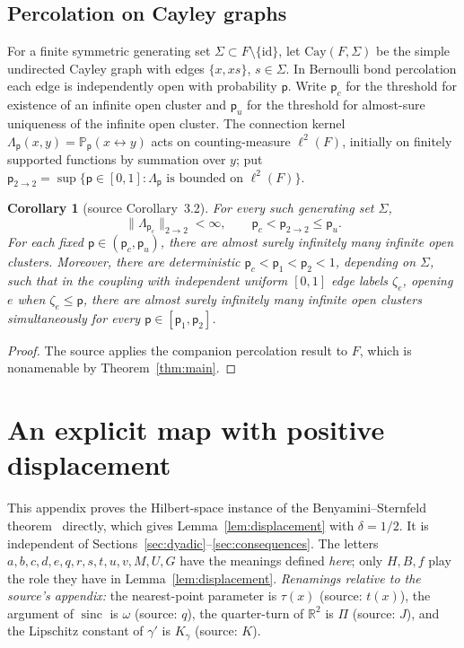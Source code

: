 \documentclass[11pt]{article}
\newcommand{\R}{\mathbb R}
\newcommand{\norm}[1]{\lVert #1\rVert}
\newcommand{\id}{\mathrm{id}}
\DeclareMathOperator{\sinc}{sinc}
\newtheorem{corollary}[theorem]{Corollary}
\theoremstyle{definition}
\numberwithin{equation}{section}
\begin{document}
\subsection{Percolation on Cayley graphs}

For a finite symmetric generating set
\(\Sigma\subset F\setminus\{\id\}\), let \(\mathrm{Cay}(F,\Sigma)\) be the
simple undirected Cayley graph with edges \(\{x,xs\}\), \(s\in\Sigma\).
In Bernoulli bond percolation each edge is independently open with
probability \(\mathsf p\). Write \(\mathsf p_c\) for the threshold for
existence of an infinite open cluster and \(\mathsf p_u\) for the
threshold for almost-sure uniqueness of the infinite open cluster. The
connection kernel
\(\Lambda_{\mathsf p}(x,y)=\mathbb P_{\mathsf p}(x\leftrightarrow y)\)
acts on counting-measure \(\ell^2(F)\), initially on finitely supported
functions by summation over \(y\); put
\(\mathsf p_{2\to2}=\sup\{\mathsf p\in[0,1]:
\Lambda_{\mathsf p}\text{ is bounded on }\ell^2(F)\}\).

\begin{corollary}[source Corollary~3.2]\label{cor:percolation}
For every such generating set \(\Sigma\),
\[
  \norm{\Lambda_{\mathsf p_c}}_{2\to2}<\infty,\qquad
  \mathsf p_c<\mathsf p_{2\to2}\le \mathsf p_u.
\]
For each fixed \(\mathsf p\in(\mathsf p_c,\mathsf p_u)\), there are almost
surely infinitely many infinite open clusters. Moreover, there are
deterministic \(\mathsf p_c<\mathsf p_1<\mathsf p_2<1\), depending on
\(\Sigma\), such that in the coupling with independent uniform \([0,1]\)
edge labels \(\zeta_e\), opening \(e\) when \(\zeta_e\le\mathsf p\), there
are almost surely infinitely many infinite open clusters simultaneously
for every \(\mathsf p\in[\mathsf p_1,\mathsf p_2]\).
\end{corollary}

\begin{proof}
The source applies the companion percolation result
\cite[Corollary~1.2]{OpenAIPercolation2026} to \(F\), which is
nonamenable by Theorem~\ref{thm:main}.
\end{proof}

\appendix
\section{An explicit map with positive displacement}\label{app:auxiliary}

This appendix proves the Hilbert-space instance of the
Benyamini--Sternfeld theorem~\cite{BenyaminiSternfeld1983} directly, which
gives Lemma~\ref{lem:displacement} with \(\delta=1/2\). It is independent
of Sections~\ref{sec:dyadic}--\ref{sec:consequences}. The letters
\(a,b,c,d,e,q,r,s,t,u,v,M,U,G\) have the meanings defined \emph{here};
only \(H,B,f\) play the role they have in Lemma~\ref{lem:displacement}.
\emph{Renamings relative to the source's appendix:} the nearest-point
parameter is \(\tau(x)\) (source: \(t(x)\)), the argument of \(\sinc\) is
\(\omega\) (source: \(q\)), the quarter-turn of \(\R^2\) is \(\Pi\)
(source: \(J\)), and the Lipschitz constant of \(\gamma'\) is
\(K_\gamma\) (source: \(K\)).
\end{document}
